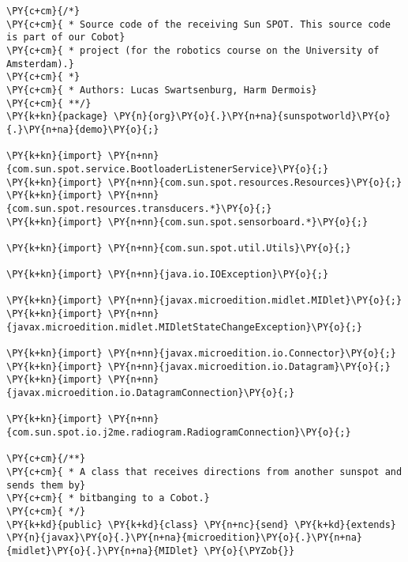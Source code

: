 \begin{Verbatim}[commandchars=\\\{\}]
\PY{c+cm}{/*}
\PY{c+cm}{ * Source code of the receiving Sun SPOT. This source code is part of our Cobot}
\PY{c+cm}{ * project (for the robotics course on the University of Amsterdam).}
\PY{c+cm}{ *}
\PY{c+cm}{ * Authors: Lucas Swartsenburg, Harm Dermois}
\PY{c+cm}{ **/}
\PY{k+kn}{package} \PY{n}{org}\PY{o}{.}\PY{n+na}{sunspotworld}\PY{o}{.}\PY{n+na}{demo}\PY{o}{;}

\PY{k+kn}{import} \PY{n+nn}{com.sun.spot.service.BootloaderListenerService}\PY{o}{;}
\PY{k+kn}{import} \PY{n+nn}{com.sun.spot.resources.Resources}\PY{o}{;}
\PY{k+kn}{import} \PY{n+nn}{com.sun.spot.resources.transducers.*}\PY{o}{;}
\PY{k+kn}{import} \PY{n+nn}{com.sun.spot.sensorboard.*}\PY{o}{;}

\PY{k+kn}{import} \PY{n+nn}{com.sun.spot.util.Utils}\PY{o}{;}

\PY{k+kn}{import} \PY{n+nn}{java.io.IOException}\PY{o}{;}

\PY{k+kn}{import} \PY{n+nn}{javax.microedition.midlet.MIDlet}\PY{o}{;}
\PY{k+kn}{import} \PY{n+nn}{javax.microedition.midlet.MIDletStateChangeException}\PY{o}{;}

\PY{k+kn}{import} \PY{n+nn}{javax.microedition.io.Connector}\PY{o}{;}
\PY{k+kn}{import} \PY{n+nn}{javax.microedition.io.Datagram}\PY{o}{;}
\PY{k+kn}{import} \PY{n+nn}{javax.microedition.io.DatagramConnection}\PY{o}{;}

\PY{k+kn}{import} \PY{n+nn}{com.sun.spot.io.j2me.radiogram.RadiogramConnection}\PY{o}{;}

\PY{c+cm}{/**}
\PY{c+cm}{ * A class that receives directions from another sunspot and sends them by}
\PY{c+cm}{ * bitbanging to a Cobot.}
\PY{c+cm}{ */}
\PY{k+kd}{public} \PY{k+kd}{class} \PY{n+nc}{send} \PY{k+kd}{extends} \PY{n}{javax}\PY{o}{.}\PY{n+na}{microedition}\PY{o}{.}\PY{n+na}{midlet}\PY{o}{.}\PY{n+na}{MIDlet} \PY{o}{\PYZob{}}


\end{Verbatim}
